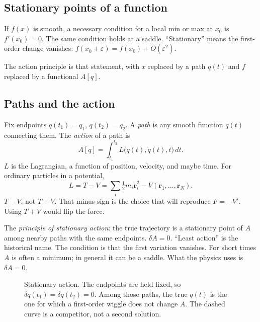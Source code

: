 \documentclass[11pt]{article}
\numberwithin{equation}{section}
\newcommand{\qdot}{\dot{q}}
\newcommand{\vect}[1]{\mathbf{#1}}
\begin{document}
\subsection{Stationary points of a function}

If $f(x)$ is smooth, a necessary condition for a local min or max at $x_0$ is $f'(x_0)=0$. The same condition holds at a saddle. ``Stationary'' means the first-order change vanishes: $f(x_0+\varepsilon)=f(x_0)+O(\varepsilon^2)$.

The action principle is that statement, with $x$ replaced by a path $q(t)$ and $f$ replaced by a functional $A[q]$.

\subsection{Paths and the action}

Fix endpoints $q(t_1)=q_1$, $q(t_2)=q_2$. A \emph{path} is any smooth function $q(t)$ connecting them. The \emph{action} of a path is
\[
A[q] = \int_{t_1}^{t_2} L\bigl(q(t),\qdot(t),t\bigr)\,dt.
\]
$L$ is the Lagrangian, a function of position, velocity, and maybe time. For ordinary particles in a potential,
\begin{equation}
\label{eq:LTV}
L = T - V
= \sum_i \tfrac12 m_i \dot{\vect{r}}_i^2 - V(\vect{r}_1,\ldots,\vect{r}_N).
\end{equation}
$T-V$, not $T+V$. That minus sign is the choice that will reproduce $F=-V'$. Using $T+V$ would flip the force.

The \emph{principle of stationary action}: the true trajectory is a stationary point of $A$ among nearby paths with the same endpoints. $\delta A=0$. ``Least action'' is the historical name. The condition is that the first variation vanishes. For short times $A$ is often a minimum; in general it can be a saddle. What the physics uses is $\delta A=0$.

\begin{figure}[ht]
\centering
{}
\caption{Stationary action. The endpoints are held fixed, so $\delta q(t_1)=\delta q(t_2)=0$. Among those paths, the true $q(t)$ is the one for which a first-order wiggle does not change $A$. The dashed curve is a competitor, not a second solution.}
\end{figure}
\end{document}
